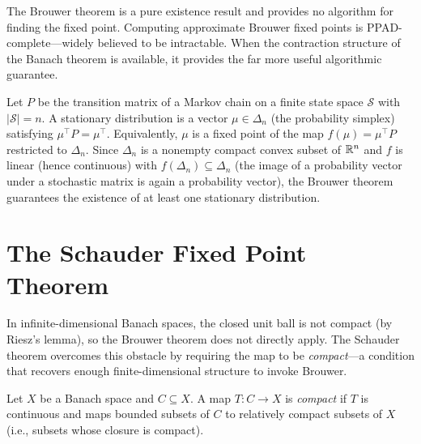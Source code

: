 \documentclass[11pt,a4paper]{article}
\begin{document}
\begin{remark}
\label{rem:brouwer-nonconstructive}
The Brouwer theorem is a pure existence result and provides no
algorithm for finding the fixed point.  Computing approximate Brouwer
fixed points is PPAD-complete---widely believed to be intractable.
When the contraction structure of the Banach theorem is available, it
provides the far more useful algorithmic guarantee.
\end{remark}

\begin{rlconnection}[title={Stationary Distributions via Brouwer}]
Let $P$ be the transition matrix of a Markov chain on a finite state
space $\mathcal{S}$ with $|\mathcal{S}| = n$.  A stationary
distribution is a vector $\mu \in \Delta_n$ (the probability simplex)
satisfying $\mu^\top P = \mu^\top$.  Equivalently, $\mu$ is a fixed
point of the map $f(\mu) = \mu^\top P$ restricted to $\Delta_n$.
Since $\Delta_n$ is a nonempty compact convex subset of $\mathbb{R}^n$ and
$f$ is linear (hence continuous) with $f(\Delta_n) \subseteq
\Delta_n$ (the image of a probability vector under a stochastic
matrix is again a probability vector), the Brouwer theorem guarantees
the existence of at least one stationary distribution.
\end{rlconnection}


\section{The Schauder Fixed Point Theorem}
\label{sec:schauder}

In infinite-dimensional Banach spaces, the closed unit ball is not
compact (by Riesz's lemma), so the Brouwer theorem does not directly
apply.  The Schauder theorem overcomes this obstacle by requiring the
map to be \emph{compact}---a condition that recovers enough
finite-dimensional structure to invoke Brouwer.

\begin{definition}
\label{def:compact-op}
Let $X$ be a Banach space and $C \subseteq X$.  A map
$T \colon C \to X$ is \emph{compact} if $T$ is continuous and maps
bounded subsets of $C$ to relatively compact subsets of $X$ (i.e.,
subsets whose closure is compact).
\end{definition}
\end{document}
